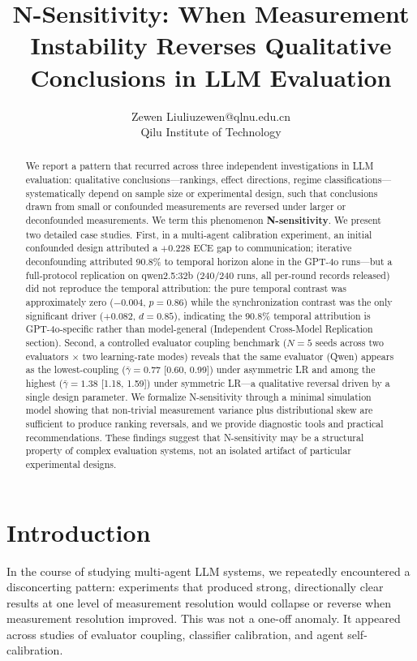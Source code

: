 \documentclass[11pt]{article}
\title{N-Sensitivity: When Measurement Instability Reverses Qualitative Conclusions in LLM Evaluation}
\author{\name Zewen Liu\email liuzewen@qlnu.edu.cn\\\addr Qilu Institute of Technology}  %
\date{}
\begin{document}
\maketitle

\begin{abstract}
We report a pattern that recurred across three independent investigations in LLM evaluation: qualitative conclusions---rankings, effect directions, regime classifications---systematically depend on sample size or experimental design, such that conclusions drawn from small or confounded measurements are reversed under larger or deconfounded measurements. We term this phenomenon \textbf{N-sensitivity}. We present two detailed case studies. First, in a multi-agent calibration experiment, an initial confounded design attributed a $+0.228$ ECE gap to communication; iterative deconfounding attributed 90.8\% to temporal horizon alone in the GPT-4o runs---but a full-protocol replication on qwen2.5:32b (240/240 runs, all per-round records released) did not reproduce the temporal attribution: the pure temporal contrast was approximately zero ($-0.004$, $p{=}0.86$) while the synchronization contrast was the only significant driver ($+0.082$, $d{=}0.85$), indicating the 90.8\% temporal attribution is GPT-4o-specific rather than model-general (Independent Cross-Model Replication section). Second, a controlled evaluator coupling benchmark ($N{=}5$ seeds across two evaluators $\times$ two learning-rate modes) reveals that the same evaluator (Qwen) appears as the lowest-coupling ($\bar{\gamma}{=}0.77$ [0.60, 0.99]) under asymmetric LR and among the highest ($\bar{\gamma}{=}1.38$ [1.18, 1.59]) under symmetric LR---a qualitative reversal driven by a single design parameter. We formalize N-sensitivity through a minimal simulation model showing that non-trivial measurement variance plus distributional skew are sufficient to produce ranking reversals, and we provide diagnostic tools and practical recommendations. These findings suggest that N-sensitivity may be a structural property of complex evaluation systems, not an isolated artifact of particular experimental designs.
\end{abstract}

\section{Introduction}

In the course of studying multi-agent LLM systems, we repeatedly encountered a disconcerting pattern: experiments that produced strong, directionally clear results at one level of measurement resolution would collapse or reverse when measurement resolution improved. This was not a one-off anomaly. It appeared across studies of evaluator coupling, classifier calibration, and agent self-calibration.
\end{document}
